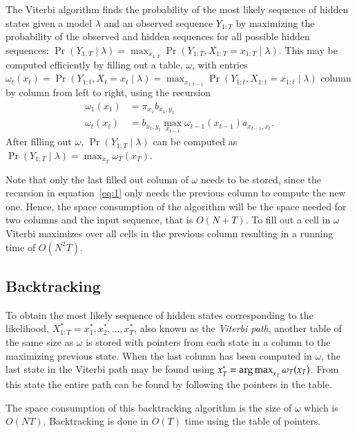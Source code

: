 The Viterbi algorithm finds the probability of the most likely sequence of
hidden states given a model $\lambda$ and an observed sequence $Y_{1:T}$ by
maximizing the probability of the observed and hidden sequences for all
possible hidden sequences: $\Pr(Y_{1:T} \mid \lambda) = \max_{x_{1:T}}
\Pr(Y_{1:T}, X_{1:T} = x_{1:T} \mid \lambda)$. This may be computed efficiently
by filling out a table, $\omega$, with entries $\omega_t(x_t) = \Pr(Y_{1:t},
X_t = x_t \mid \lambda) = \max_{x_{1:t-1}} \Pr(Y_{1:t}, X_{1:t} = x_{1:t} \mid
\lambda)$ column by column from left to right, using the recursion
\begin{equation}
  \label{eq:1}
  \begin{aligned}
    \omega_1(x_1) &= \pi_{x_1} b_{x_1, y_1} \\
    \omega_t(x_t) &= b_{x_t, y_t} \max_{x_{t - 1}} \omega_{t - 1}(x_{t - 1})
    a_{x_{t - 1}, x_t}.
  \end{aligned}
\end{equation}
After filling out $\omega$, $\Pr(Y_{1:T} \mid \lambda)$ can be computed as
$\Pr(Y_{1:T} \mid \lambda) = \max_{x_T} \omega_T(x_T)$.

Note that only the last filled out column of $\omega$ needs to be stored, since
the recursion in equation~\eqref{eq:1} only needs the previous column to
compute the new one. Hence, the space consumption of the algorithm will be the
space needed for two columns and the input sequence, that is $O(N + T)$. To
fill out a cell in $\omega$ Viterbi maximizes over all cells in the previous
column resulting in a running time of $O(N^2 T)$.

\subsection{Backtracking}
\label{sec:backtracking-1}

To obtain the most likely sequence of hidden states corresponding to the
likelihood, $X_{1:T}^* = x_1^*, x_2^*, \dots, x_T^*$, also known as the
\emph{Viterbi path}, another table of the same size as $\omega$ is stored with
pointers from each state in a column to the maximizing previous state. When the
last column has been computed in $\omega$, the last state in the Viterbi path
may be found using $x_T^* = \operatorname*{arg\,max}_{x_T} \omega_T(x_T)$. From this state the entire
path can be found by following the pointers in the table.

The space consumption of this backtracking algorithm is the size of $\omega$
which is $O(N T)$. Backtracking is done in $O(T)$ time using the table of pointers.

